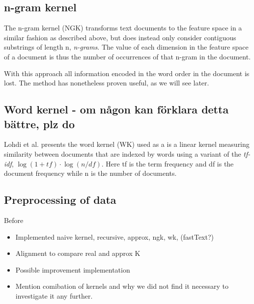 \subsection{n-gram kernel}
The n-gram kernel (NGK) transforms text documents to the feature space in a similar fashion as described above, but does instead only consider contiguous substrings of length n, \textit{n-grams}. The value of each dimension in the feature space of a document is thus the number of occurrences of that n-gram in the document. 

With this approach all information encoded in the word order in the document is lost. The method has nonetheless proven useful, as we will see later.

\subsection{Word kernel - om någon kan förklara detta bättre, plz do}
Lohdi et al. presents the word kernel (WK) used as a is a linear kernel measuring similarity between documents that are indexed by words using a variant of the \textit{tf-idf}, $ \log(1+tf) \cdot \log(n/df) $. Here tf is the term frequency and df is the document frequency while n is the number of documents. 


\subsection{Preprocessing of data}
Before 



\begin{itemize}
	\item Implemented naive kernel, recursive, approx, ngk, wk, (fastText?)
	
	\item Alignment to compare real and approx K
	
	\item Possible improvement implementation 
	
	\item Mention comibation of kernels and why we did not find it necessary to investigate it any further. 
	
\end{itemize}

